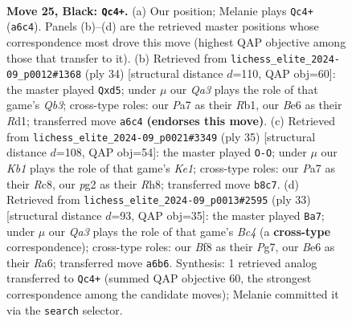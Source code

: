 \documentclass[11pt]{article}
\begin{document}
\clearpage

\begin{figure}[p]\centering
\begin{subfigure}{0.46\textwidth}\centering
\resizebox{\linewidth}{!}{%
\newchessgame
\chessboard[
  setfen={rk3b2/pp4pr/q1p1b2p/P2p1p2/3P3P/3QPN2/1PKB1PP1/1R4R1 b - - 2 25},
  showmover=false,
  pgfstyle=straightmove, color=movearrow, markmove={a6-c4}
]}
\caption{}
\end{subfigure}\hfill
\begin{subfigure}{0.46\textwidth}\centering
\resizebox{\linewidth}{!}{%
\newchessgame
\chessboard[
  setfen={2r2rk1/1p2bppp/p1p2n2/3q1p2/1P1P1B2/PQ2PN2/5PPP/1R1R2K1 w - - 0 18},
  showmover=false,
  pgfstyle=straightmove, color=movearrow, markmove={b3-d5}
]}
\caption{}
\end{subfigure}
\\[4pt]
\begin{subfigure}{0.46\textwidth}\centering
\resizebox{\linewidth}{!}{%
\newchessgame
\chessboard[
  setfen={2r1k2r/pp1n1pb1/2q3pp/P1p1p3/4Q3/3PN2P/1PPB1PP1/R4RK1 b k - 0 18},
  showmover=false,
  pgfstyle=straightmove, color=movearrow, markmove={e8-g8}
]}
\caption{}
\end{subfigure}\hfill
\begin{subfigure}{0.46\textwidth}\centering
\resizebox{\linewidth}{!}{%
\newchessgame
\chessboard[
  setfen={3r2k1/2p2pp1/r1pp1q1p/p1b5/Q2PP3/1P3N2/P4PPP/1R3RK1 b - - 0 17},
  showmover=false,
  pgfstyle=straightmove, color=movearrow, markmove={c5-a7}
]}
\caption{}
\end{subfigure}
\caption{\textbf{Move 25, Black: \texttt{Qc4+}.} (a) Our position; Melanie plays \texttt{Qc4+} (\texttt{a6c4}). Panels (b)--(d) are the retrieved master positions whose correspondence most drove this move (highest QAP objective among those that transfer to it). (b) Retrieved from \texttt{lichess\_elite\_2024-09\_p0012\#1368} (ply 34) [structural distance $d$=110, QAP obj=60]: the master played \texttt{Qxd5}; under $\mu$ our \emph{Qa3} plays the role of that game's \emph{Qb3}; cross-type roles: our \emph{P}a7 as their \emph{R}b1, our \emph{B}e6 as their \emph{R}d1; transferred move \texttt{a6c4} \textbf{(endorses this move)}. (c) Retrieved from \texttt{lichess\_elite\_2024-09\_p0021\#3349} (ply 35) [structural distance $d$=108, QAP obj=54]: the master played \texttt{O-O}; under $\mu$ our \emph{Kb1} plays the role of that game's \emph{Ke1}; cross-type roles: our \emph{P}a7 as their \emph{R}c8, our \emph{p}g2 as their \emph{R}h8; transferred move \texttt{b8c7}. (d) Retrieved from \texttt{lichess\_elite\_2024-09\_p0013\#2595} (ply 33) [structural distance $d$=93, QAP obj=35]: the master played \texttt{Ba7}; under $\mu$ our \emph{Qa3} plays the role of that game's \emph{Bc4} (a \textbf{cross-type} correspondence); cross-type roles: our \emph{B}f8 as their \emph{P}g7, our \emph{B}e6 as their \emph{R}a6; transferred move \texttt{a6b6}. Synthesis: 1 retrieved analog transferred to \texttt{Qc4+} (summed QAP objective 60, the strongest correspondence among the candidate moves); Melanie committed it via the \texttt{search} selector.}
\label{fig:thought-m49}
\end{figure}
\end{document}
